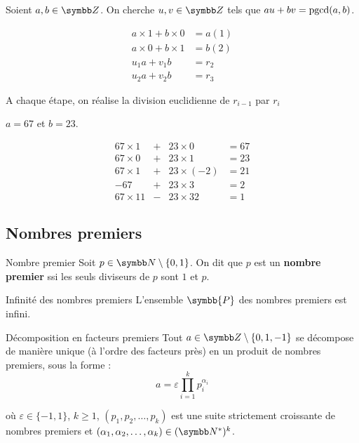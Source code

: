Soient $a, b \in \Z$. On cherche $u, v \in \Z$ tels que $au + bv = \operatorname{pgcd}(a, b)$.


\begin{align*}
    a \times 1 + b \times 0 & = a (1)\\
    a \times 0 + b \times 1 & = b (2)\\
    u_1 a + v_1 b & = r_2 \\
    u_2 a + v_2 b & = r_3 
\end{align*}

A chaque étape, on réalise la division euclidienne de $r_{i-1}$ par $r_i$

\begin{exemple}
    $a = 67$ et $b = 23$. 

    \[\begin{array}{rccl}
        67 \times 1 & + & 23 \times 0 & = 67 \\
        67 \times 0 & + & 23 \times 1 & = 23 \\
        67 \times 1 & + & 23 \times (-2) & = 21 \\
        -67 & + & 23 \times 3 & = 2 \\
        67 \times 11 & - & 23 \times 32 & = 1
    \end{array}\]
\end{exemple}

\subsection{Nombres premiers}

\begin{definition}{Nombre premier}{}
    Soit $p \in \N \setminus \{0, 1\}$. On dit que $p$ est un \textbf{nombre premier} ssi
    les seuls diviseurs de $p$ sont $1$ et $p$.
\end{definition}

\begin{proposition}{Infinité des nombres premiers}{}
    L'ensemble $\symbb{P}$ des nombres premiers est infini.
\end{proposition}

\begin{theoreme}{Décomposition en facteurs premiers}{}
    Tout $a \in \Z \setminus \{0, 1, -1\}$ se décompose de manière unique (à l'ordre des facteurs près) en un produit
    de nombres premiers, sous la forme : 
    \[ a = \varepsilon \prod_{i = 1}^k p_i^{\alpha_i}\]

    où $\varepsilon \in \{-1, 1\}$, $k \geqslant 1$, $(p_1, p_2, \ldots, p_k)$ est une suite strictement croissante de nombres premiers
    et $(\alpha_1, \alpha_2, \ldots, \alpha_k) \in (\N^*)^k$.
    
\end{theoreme}

